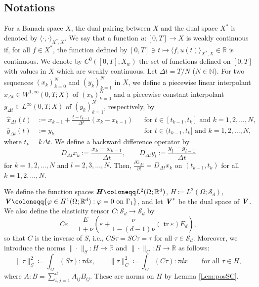 \documentclass[11pt, a4paper]{article}
\newcommand{\R}{{\mathbb R}}
\newcommand{\N}{{\mathbb N}}
\newcommand{\Sym}{{\mathcal S}}
\newcommand{\tr}{\operatorname{tr}}
\newcommand{\defeq}{\coloneqq}
\newcommand{\into}{\int_\Omega}
\newcommand{\dt}{{\Delta t}}
\newcommand{\bm}[1]{\textbf{\textit{#1}}}%
\newcommand{\Hv}{{\bm{H}}}
\newcommand{\Vv}{{\bm{V}}}
\newcommand{\Hs}{{H}}
\newcommand{\eps}{\varepsilon}
\begin{document}
\subsection{Notations}

For a Banach space $X$, the dual pairing between $X$ and the dual space $X^*$ is denoted by $\langle\cdot,\cdot\rangle_{\!X^*,X}$.
We say that a function $u:[0, T]\rightarrow X$ is weakly continuous if, for all $f \in X^*$, the function defined by $[0,T]\ni t\mapsto\langle f,u(t)\rangle_{\!X^*,X}\in\R$ is continuous. We denote by $C^0([0,T];X_w)$ the set of functions defined on $[0,T]$ with values in $X$ which are weakly continuous.
Let $\dt=T/N$ ($N\in\N$). For two sequences $(x_k)_{k=0}^N$ and $(y_k)_{k=1}^N$ in $X$, we define a piecewise linear interpolant $\hat{x}_\dt \in W^{1, \infty}(0, T; X)$ of $(x_k)_{k=0}^N$ and a piecewise constant interpolant $\bar{y}_\dt \in L^\infty(0, T; X)$ of $(y_k)_{k=1}^N$, respectively, by
\[\begin{aligned}
    \hat{x}_\dt(t)&:=x_{k-1}+\frac{t-t_{k-1}}{\dt}(x_k-x_{k-1})
    &&\text{for }t\in[t_{k-1},t_k] \mbox{ and }k=1,2,\ldots,N,\\
    \bar{y}_\dt(t)&:=y_k
    &&\text{for }t\in(t_{k-1},t_k] \mbox{ and }k=1,2,\ldots,N,
\end{aligned}\]
where $t_k=k\dt$.
We define a backward difference operator by 
\[
    D_\dt x_k:=\frac{x_k-x_{k-1}}{\dt},\qquad
    D_\dt y_l:=\frac{y_l-y_{l-1}}{\dt}
\]
for $k=1,2,\ldots,N$ and $l=2,3,\ldots,N$.
Then, $\frac{\partial\hat{x}_\dt}{\partial t}=D_\dt x_k$
on $(t_{k-1},t_k)$ for all $k=1,2,\ldots,N$.

We define the function spaces
$\Hv \defeq L^2(\Omega;\R^d)$,
$\Hs \defeq L^2(\Omega;\Sym_d)$,
$\Vv \defeq \{\varphi\in H^1(\Omega;\R^d):\varphi=0\mbox{ on }\Gamma_1\}$,
and let $\Vv^*$ be the dual space of $\Vv$. 
We also define the elasticity tensor $C:\Sym_d\to\Sym_d$ by
\[
    C\eps=\frac{E}{1+\nu}\left(\eps+\frac{\nu}{1-(d-1)\nu}(\tr\eps)E_d\right),
\]
so that $C$ is the inverse of $S$, i.e., $CS\tau=SC\tau=\tau$ for all $\tau\in\Sym_d$. 
Moreover, we introduce the norms $\|\cdot\|_S:\Hs\rightarrow\R$ and $\|\cdot\|_C:\Hs\rightarrow\R$ as follows:
\[
    \|\tau\|_S^2 \defeq \into (S\tau):\tau dx,\qquad 
    \|\tau\|_C^2 \defeq \into (C\tau):\tau dx\qquad\text{for all }\tau\in\Hs,
\]
where $A:B=\sum_{i,j=1}^{d} A_{ij}B_{ij}$. These are norms on $\Hs$ by Lemma \ref{Lem:posSC}.
\end{document}
